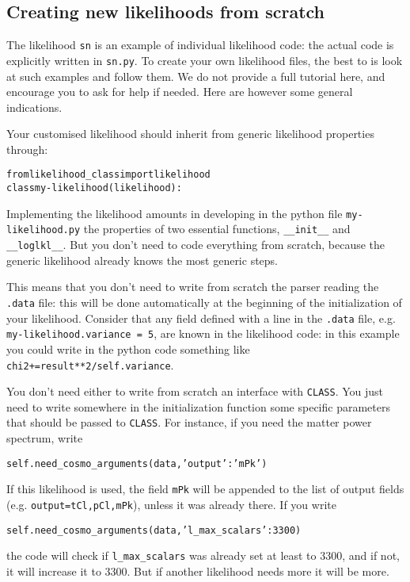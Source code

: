 \documentclass[10pt]{article}
\newcommand{\CLASS}{\texttt{CLASS}}
\begin{document}
\subsection{Creating new likelihoods from scratch}

The likelihood \verb?sn? is an example of individual likelihood code: the actual code is explicitly written in \verb?sn.py?. To create your own likelihood files, the best to is look at such examples and follow them. We do not provide a full tutorial here, and encourage you to ask for help if needed. Here are however some general indications.

Your customised likelihood should inherit from generic likelihood properties through:
 \begin{alltt}
  from likelihood_class import likelihood
  class my-likelihood(likelihood):
  \end{alltt}

Implementing the likelihood amounts in developing in the python file \verb?my-likelihood.py? the properties of two essential functions, \verb?__init__? and \verb?__loglkl__?. But you don't need to code everything from scratch, because the generic likelihood already knows the most generic steps.

This means that you don't need to write from scratch the parser reading the \verb?.data? file: this will be done automatically at the beginning of the initialization of your likelihood. Consider that any field defined with a line in the \verb?.data? file, e.g. \verb?my-likelihood.variance = 5?, are known in the likelihood code: in this example you could write in the python code something like \verb?chi2+=result**2/self.variance?.

You don't need either to write from scratch an interface with \CLASS. You just need to write somewhere in the initialization function  some specific parameters that should be passed to \CLASS. For instance, if you need the matter power spectrum, write
\begin{alltt}
self.need_cosmo_arguments(data,{'output':'mPk'})
  \end{alltt}
  If this likelihood is used, the field \verb?mPk? will be appended to the list of output fields (e.g. \verb?output=tCl,pCl,mPk?), unless it was already there. If you write
\begin{alltt}
self.need_cosmo_arguments(data,{'l_max_scalars':3300})
   \end{alltt}
   the code will check if \verb?l_max_scalars? was already set at least to 3300, and if not, it will increase it to 3300. But if another likelihood needs more it will be more.
   
\end{document}
